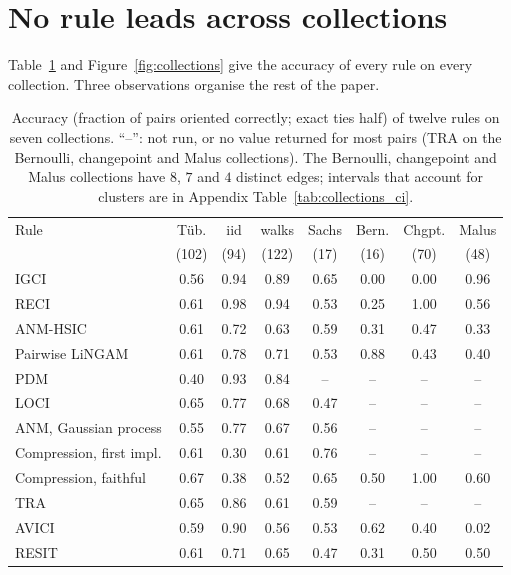 \section{No rule leads across collections}\label{sec:coll}

Table~\ref{tab:collections2} and Figure~\ref{fig:collections} give the accuracy of every rule on every collection. Three observations organise the rest of the paper.

\begin{table}[t]
\caption{Accuracy (fraction of pairs oriented correctly; exact ties half) of twelve rules on seven collections. ``--'': not run, or no value returned for most pairs (TRA on the Bernoulli, changepoint and Malus collections). The Bernoulli, changepoint and Malus collections have $8$, $7$ and $4$ distinct edges; intervals that account for clusters are in Appendix Table~\ref{tab:collections_ci}.}
\label{tab:collections2}
\small
\setlength{\tabcolsep}{4pt}
\begin{tabular}{@{}lccccccc@{}}
\toprule
Rule & T\"ub. & iid & walks & Sachs & Bern. & Chgpt. & Malus\\
 & (102) & (94) & (122) & (17) & (16) & (70) & (48)\\
\midrule
IGCI & 0.56 & 0.94 & 0.89 & 0.65 & 0.00 & 0.00 & 0.96\\
RECI & 0.61 & 0.98 & 0.94 & 0.53 & 0.25 & 1.00 & 0.56\\
ANM-HSIC & 0.61 & 0.72 & 0.63 & 0.59 & 0.31 & 0.47 & 0.33\\
Pairwise LiNGAM & 0.61 & 0.78 & 0.71 & 0.53 & 0.88 & 0.43 & 0.40\\
PDM & 0.40 & 0.93 & 0.84 & -- & -- & -- & --\\
LOCI & 0.65 & 0.77 & 0.68 & 0.47 & -- & -- & --\\
ANM, Gaussian process & 0.55 & 0.77 & 0.67 & 0.56 & -- & -- & --\\
Compression, first impl. & 0.61 & 0.30 & 0.61 & 0.76 & -- & -- & --\\
Compression, faithful & 0.67 & 0.38 & 0.52 & 0.65 & 0.50 & 1.00 & 0.60\\
TRA & 0.65 & 0.86 & 0.61 & 0.59 & -- & -- & --\\
AVICI & 0.59 & 0.90 & 0.56 & 0.53 & 0.62 & 0.40 & 0.02\\
RESIT & 0.61 & 0.71 & 0.65 & 0.47 & 0.31 & 0.50 & 0.50\\
\bottomrule
\end{tabular}
\end{table}

